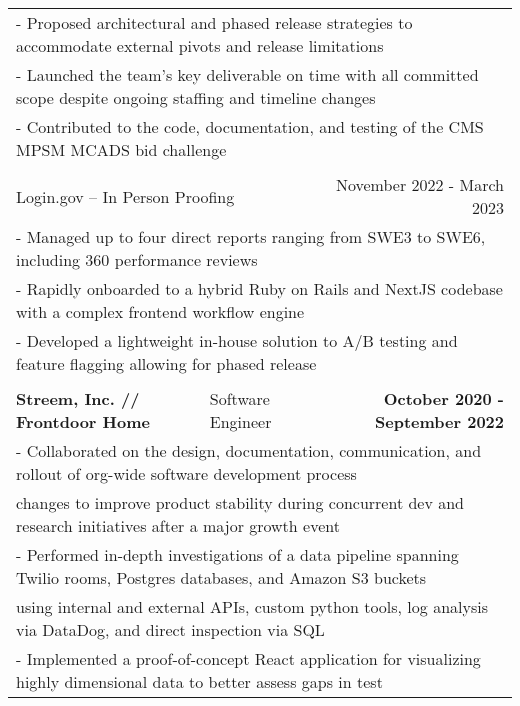 \documentclass[letterpaper]{article}
\begin{document}
\begin{center}
\begin{tabular}{p{}p{}r}
			  \multicolumn{3}{p{\textwidth}}{\quad\quad - Proposed architectural and phased release strategies to accommodate external pivots and release limitations} \\
			  \multicolumn{3}{p{\textwidth}}{\quad\quad - Launched the team's key deliverable on time with all committed scope despite ongoing staffing and timeline changes} \\
			  \multicolumn{3}{p{\textwidth}}{\quad\quad - Contributed to the code, documentation, and testing of the CMS MPSM MCADS bid challenge } 

		  \\
		  \\
			  \multicolumn{2}{p{0.5\textwidth}}{\quad Login.gov -- In Person Proofing}
			  &
			  {November 2022 - March 2023 \quad\quad\quad\quad}
		  \\
			  \multicolumn{3}{p{\textwidth}}{\quad\quad - Managed up to four direct reports ranging from SWE3 to SWE6, including 360 performance reviews} \\
			  \multicolumn{3}{p{\textwidth}}{\quad\quad - Rapidly onboarded to a hybrid Ruby on Rails and NextJS codebase with a complex frontend workflow engine} \\
			  \multicolumn{3}{p{\textwidth}}{\quad\quad - Developed a lightweight in-house solution to A/B testing and feature flagging allowing for phased release}
		  \\
		  \\
				\textbf{Streem, Inc. // Frontdoor Home} &
				\quad\quad\quad\quad\quad\quad Software Engineer &
				\textbf{October 2020 - September 2022\quad}
			\\
				\multicolumn{3}{p{\textwidth}}{\quad\quad - Collaborated on the design, documentation, communication, and rollout of org-wide software development process}
			\\
				\multicolumn{3}{p{\textwidth}}{\quad\quad\quad changes to improve product stability during concurrent dev and research initiatives after a major growth event} 
			\\
				\multicolumn{3}{p{\textwidth}}{\quad\quad - Performed in-depth investigations of a data pipeline spanning Twilio rooms, Postgres databases, and Amazon S3 buckets}  
			\\
				\multicolumn{3}{p{\textwidth}}{\quad\quad\quad using internal and external APIs, custom python tools, log analysis via DataDog, and direct inspection via SQL}
			\\
			    \multicolumn{3}{p{\textwidth}}{\quad\quad - Implemented a proof-of-concept React application for visualizing highly dimensional data to better assess gaps in test}

\end{tabular}
\end{center}
\end{document}
